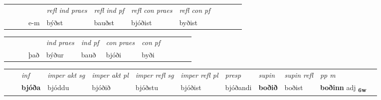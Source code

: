 \begin{tabular}{llllllllllll}
 & &  & &  \textit{refl ind praes} & \textit{refl ind pf} & \textit{refl con praes} & \textit{refl con pf} \\*
&  & & e-m & býðst & bauðst & bjóðist & byðist \\*
\cmidrule{5-9}
\end{tabular}


\begin{tabular}{llllllllllll}
 & &  & &  \textit{ind praes} & \textit{ind pf} & \textit{con praes} & \textit{con pf} \\*
&  & & það & býður & bauð & bjóði & byði \\*
\cmidrule{5-9}
\end{tabular}


\begin{tabular}{llllllllllll}
 & & \textit{inf} & \textit{imper akt sg} & \textit{imper akt pl} & \textit{imper refl sg} & \textit{imper refl pl} & \textit{presp} & \textit{supin} & \textit{supin refl} & \textit{pp m}     \\*
  & & \textbf{bjóða} & bjóddu  & bjóðið & bjóðstu & bjóðist & bjóðandi &  \textbf{boðið} & boðist & \textbf{boðinn} adj \textbf{\textsubscript{6w}} \\*
\cmidrule{1-12}
\end{tabular}



